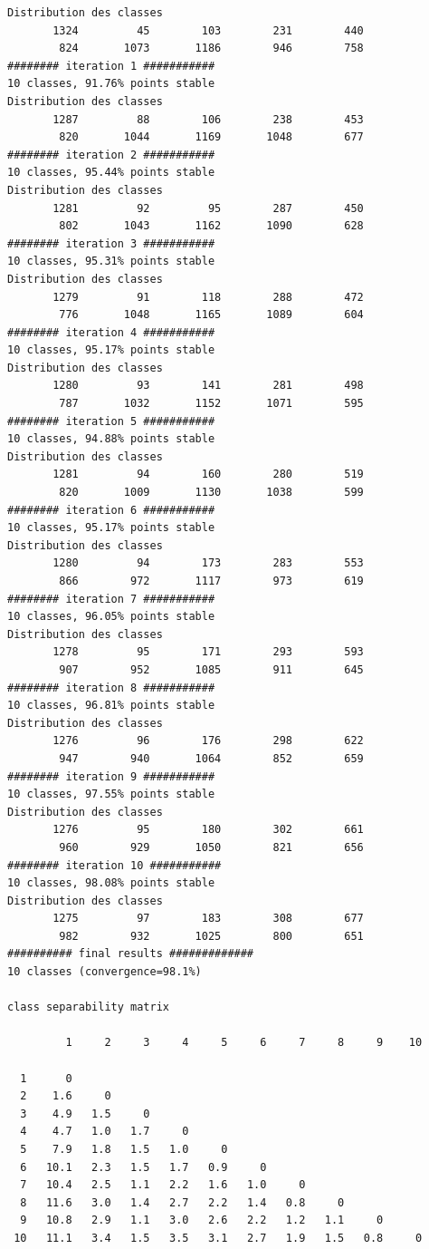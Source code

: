 \documentclass[land,article,submit,pdftex,moreauthors]{Definitions/mdpi}
\begin{document}
\begin{scriptsize}
\begin{verbatim}
Distribution des classes
       1324         45        103        231        440
        824       1073       1186        946        758
######## iteration 1 ###########
10 classes, 91.76% points stable
Distribution des classes
       1287         88        106        238        453
        820       1044       1169       1048        677
######## iteration 2 ###########
10 classes, 95.44% points stable
Distribution des classes
       1281         92         95        287        450
        802       1043       1162       1090        628
######## iteration 3 ###########
10 classes, 95.31% points stable
Distribution des classes
       1279         91        118        288        472
        776       1048       1165       1089        604
######## iteration 4 ###########
10 classes, 95.17% points stable
Distribution des classes
       1280         93        141        281        498
        787       1032       1152       1071        595
######## iteration 5 ###########
10 classes, 94.88% points stable
Distribution des classes
       1281         94        160        280        519
        820       1009       1130       1038        599
######## iteration 6 ###########
10 classes, 95.17% points stable
Distribution des classes
       1280         94        173        283        553
        866        972       1117        973        619
######## iteration 7 ###########
10 classes, 96.05% points stable
Distribution des classes
       1278         95        171        293        593
        907        952       1085        911        645
######## iteration 8 ###########
10 classes, 96.81% points stable
Distribution des classes
       1276         96        176        298        622
        947        940       1064        852        659
######## iteration 9 ###########
10 classes, 97.55% points stable
Distribution des classes
       1276         95        180        302        661
        960        929       1050        821        656
######## iteration 10 ###########
10 classes, 98.08% points stable
Distribution des classes
       1275         97        183        308        677
        982        932       1025        800        651
########## final results #############
10 classes (convergence=98.1%)

class separability matrix

         1     2     3     4     5     6     7     8     9    10

  1      0
  2    1.6     0
  3    4.9   1.5     0
  4    4.7   1.0   1.7     0
  5    7.9   1.8   1.5   1.0     0
  6   10.1   2.3   1.5   1.7   0.9     0
  7   10.4   2.5   1.1   2.2   1.6   1.0     0
  8   11.6   3.0   1.4   2.7   2.2   1.4   0.8     0
  9   10.8   2.9   1.1   3.0   2.6   2.2   1.2   1.1     0
 10   11.1   3.4   1.5   3.5   3.1   2.7   1.9   1.5   0.8     0


\end{verbatim}
\end{scriptsize}
\end{document}
